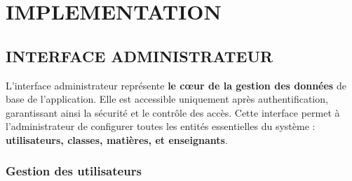 \documentclass[english,12pt,a4paper]{report}
\begin{document}
 \chapter{IMPLEMENTATION}

 \section{INTERFACE ADMINISTRATEUR}
 L’interface administrateur représente \textbf{le cœur de la gestion des données} de base de l’application. Elle est accessible uniquement après authentification, garantissant ainsi la sécurité et le contrôle des accès. Cette interface permet à l'administrateur de configurer toutes les entités essentielles du système : \textbf{utilisateurs, classes, matières, et enseignants}.
 
 \subsection{Gestion des utilisateurs}
 
\end{document}
